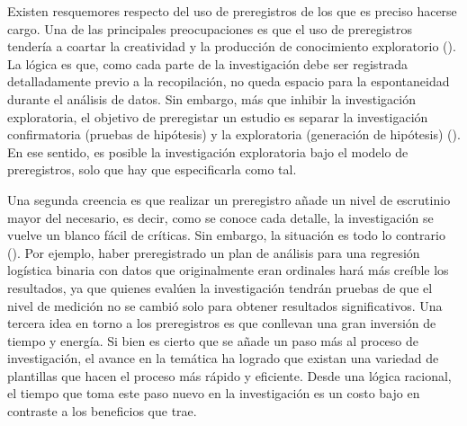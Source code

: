 \documentclass[
  spanish,
  a4paper,
  oneside]{scrbook}
\begin{document}
Existen resquemores respecto del uso de preregistros de los que es
preciso hacerse cargo. Una de las principales preocupaciones es que el
uso de preregistros tendería a coartar la creatividad y la producción de
conocimiento exploratorio (). La lógica es que, como cada parte de la investigación debe ser
registrada detalladamente previo a la recopilación, no queda espacio
para la espontaneidad durante el análisis de datos. Sin embargo, más que
inhibir la investigación exploratoria, el objetivo de preregistar un
estudio es separar la investigación confirmatoria (pruebas de hipótesis)
y la exploratoria (generación de hipótesis)
().
En ese sentido, es posible la investigación exploratoria bajo el modelo
de preregistros, solo que hay que especificarla como tal.

Una segunda creencia es que realizar un preregistro añade un nivel de
escrutinio mayor del necesario, es decir, como se conoce cada detalle,
la investigación se vuelve un blanco fácil de críticas. Sin embargo, la
situación es todo lo contrario
(). Por ejemplo, haber
preregistrado un plan de análisis para una regresión logística binaria
con datos que originalmente eran ordinales hará más creíble los
resultados, ya que quienes evalúen la investigación tendrán pruebas de
que el nivel de medición no se cambió solo para obtener resultados
significativos. Una tercera idea en torno a los preregistros es que
conllevan una gran inversión de tiempo y energía. Si bien es cierto que
se añade un paso más al proceso de investigación, el avance en la
temática ha logrado que existan una variedad de plantillas que hacen el
proceso más rápido y eficiente. Desde una lógica racional, el tiempo que
toma este paso nuevo en la investigación es un costo bajo en contraste a
los beneficios que trae.
\end{document}
